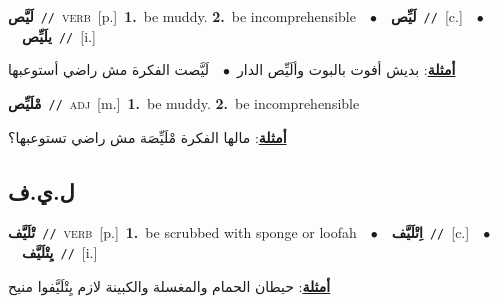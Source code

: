 \documentclass[10pt,a4paper,twoside]{article} %
\begin{document}
\begin{multicols}{2}
{\setlength\topsep{0pt}\textbf{\foreignlanguage{arabic}{لَيَّص}}\ {\color{gray}\texttt{//}\color{black}}\ \textsc{verb}\ [p.]\ \textbf{1.}~be muddy.  \textbf{2.}~be incomprehensible\ \ $\bullet$\ \ \setlength\topsep{0pt}\textbf{\foreignlanguage{arabic}{لَيِّص}}\ {\color{gray}\texttt{//}\color{black}}\ [c.]\ \ $\bullet$\ \ \setlength\topsep{0pt}\textbf{\foreignlanguage{arabic}{يلَيِّص}}\ {\color{gray}\texttt{//}\color{black}}\ [i.]\  \begin{flushright}\color{gray}\foreignlanguage{arabic}{\textbf{\underline{\foreignlanguage{arabic}{أمثلة}}}: بديش أفوت بالبوت وألَيِّص الدار\ $\bullet$\ \  لَيَّصت الفكرة مش راضي أستوعبها}\end{flushright}\color{black}} \vspace{2mm}

{\setlength\topsep{0pt}\textbf{\foreignlanguage{arabic}{مْلَيِّص}}\ {\color{gray}\texttt{//}\color{black}}\ \textsc{adj}\ [m.]\ \textbf{1.}~be muddy.  \textbf{2.}~be incomprehensible\  \begin{flushright}\color{gray}\foreignlanguage{arabic}{\textbf{\underline{\foreignlanguage{arabic}{أمثلة}}}: مالها الفكرة مْلَيِّصَة مش راضي تستوعبها؟}\end{flushright}\color{black}} \vspace{2mm}

\vspace{-3mm}
\subsection*{\color{blue}\foreignlanguage{arabic}{ل.ي.ف}\color{blue}{}} 

{\setlength\topsep{0pt}\textbf{\foreignlanguage{arabic}{تْلَيَّف}}\ {\color{gray}\texttt{//}\color{black}}\ \textsc{verb}\ [p.]\ \textbf{1.}~be scrubbed with sponge or loofah\ \ $\bullet$\ \ \setlength\topsep{0pt}\textbf{\foreignlanguage{arabic}{اِتْلَيَّف}}\ {\color{gray}\texttt{//}\color{black}}\ [c.]\ \ $\bullet$\ \ \setlength\topsep{0pt}\textbf{\foreignlanguage{arabic}{يِتْلَيَّف}}\ {\color{gray}\texttt{//}\color{black}}\ [i.]\  \begin{flushright}\color{gray}\foreignlanguage{arabic}{\textbf{\underline{\foreignlanguage{arabic}{أمثلة}}}: حيطان الحمام والمغسلة والكبينة لازم يِتْلَيَّفوا منيح}\end{flushright}\color{black}} \vspace{2mm}


\end{multicols}
\end{document}
